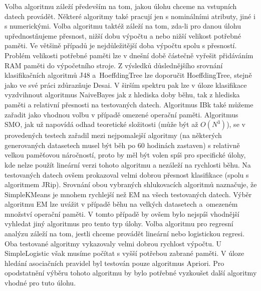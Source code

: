\documentclass[12pt]{article}
\begin{document}
Volba algoritmu záleží především na tom, jakou úlohu chceme na vstupních datech provádět. Některé algoritmy také pracují jen s nominálními atributy, jiné i s numerickými. Volba algoritmu taktéž záleží na tom, zda-li pro danou úlohu upřednostňujeme přesnost, nižší dobu výpočtu a nebo nižší velikost potřebné paměti. Ve většině případů je nejdůležitější doba výpočtu spolu s přesností. Problém velikosti potřebné paměti lze v dnešní době částečně vyřešit přidáváním RAM paměti do výpočetního stroje.
\newline
\indent
Z výsledků důslednějšího srovnání klasifikačních algoritmů J48 a~HoeffdingTree lze doporučit HoeffdingTree, stejně jako ve své práci zdůrazňuje Desai. \citep{desai} 
\newline
\indent
V širším spektru pak lze v úloze klasifikace vyzdvihnout algoritmus NaiveBayes jak z hlediska doby běhu, tak z hlediska paměti a relativní přesnosti na testovaných datech. Algoritmus IBk také můžeme zařadit jako vhodnou volbu v případě omezené operační paměti. Algoritmus SMO, jak už napovídá odhad teoretické složitosti (může být až $O(N^3)$), se v provedených testech zařadil mezi nejpomalejší algoritmy (na některých generovaných datasetech musel být běh po 60 hodinách zastaven) s relativně velkou paměťovou náročností, proto by měl být volen spíš pro specifické úlohy, kde nelze použít lineární verzi tohoto algoritmu a nezáleží na rychlosti běhu. Na testovaných datech ovšem prokazoval velmi dobrou přesnost klasifikace (spolu s algoritmem JRip).
\newline
\indent
Srovnání obou vybraných shlukovacích algoritmů naznačuje, že SimpleKMeans je mnohem rychlejší než EM na všech testovaných datech. Výběr algoritmu EM lze uvážit v případě běhu na velkých datasetech a~omezeném množství operační paměti. V tomto případě by ovšem bylo nejspíš vhodnější vyhledat jiný algoritmus pro tento typ úlohy.
\newline
\indent
Volba algoritmu pro regresní analýzu záleží na tom, jestli chceme provádět lineární nebo logistickou regresi. Oba testované algoritmy vykazovaly velmi dobrou rychlost výpočtu. U SimpleLogistic však musíme počítat s vyšší potřebou zabrané paměti.
\newline
\indent
V úloze hledání asociačních pravidel byl testován pouze algoritmus Apriori. Pro opodstatnění výběru tohoto algoritmu by bylo potřebné vyzkoušet další algoritmy vhodné pro tuto úlohu. 
\end{document}
